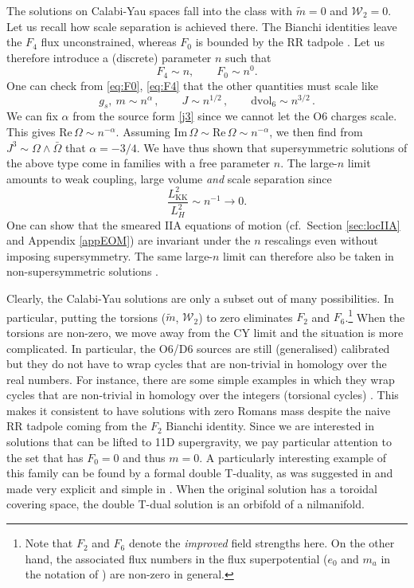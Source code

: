 \documentclass[11pt]{article}
\newcommand{\be}{\begin{equation}}
\newcommand{\ee}{\end{equation}}
\def\be{\begin{equation}}
\def\ee{\end{equation}}
\renewcommand{\[}{\left[}
\renewcommand{\]}{\right]}
\renewcommand{\(}{\left(}
\renewcommand{\)}{\right)}
\newcommand{\w}{\wedge}
\renewcommand{\Im}{\text{Im}\,}
\renewcommand{\Re}{\text{Re}\,}
\newcommand{\<}{\langle}
\renewcommand{\>}{\rangle}
\begin{document}
The solutions on Calabi-Yau spaces fall into the class with $\tilde{m}=0$ and $\mathcal{W}_2=0$. Let us recall how scale separation is achieved there.  The Bianchi identities leave the $F_4$ flux unconstrained, whereas $F_0$ is bounded by the RR tadpole \cite{DeWolfe:2005uu}. Let us therefore introduce a (discrete) parameter $n$ such that
\be
F_4 \sim n, \qquad F_0 \sim n^0.
\ee
One can check from \eqref{eq:F0}, \eqref{eq:F4} that the other quantities must scale like
\be
g_s, \: m \sim n^\alpha\,, \qquad J\sim n^{1/2}\,,\qquad \text{dvol}_6\sim  n^{3/2} \,.
\ee
We can fix $\alpha$ from the source form \eqref{j3} since we cannot let the O6 charges scale. This gives $\Re \Omega \sim n^{-\alpha}$. Assuming $\Im \Omega \sim \Re \Omega \sim n^{-\alpha}$, we then find from $J^3 \sim \Omega \w \bar\Omega$  that $\alpha = -3/4$. We have thus shown that supersymmetric solutions of the above type come in families with a free parameter $n$. The large-$n$ limit amounts to weak coupling, large volume \emph{and} scale separation since
\be
\frac{L^2_\text{KK}}{L^2_H} \sim n^{-1} \rightarrow 0.
\ee
One can show that the smeared IIA equations of motion (cf.~Section \ref{sec:locIIA} and Appendix \ref{appEOM}) are invariant under the $n$ rescalings even without imposing supersymmetry. The same large-$n$ limit can therefore also be taken in non-supersymmetric solutions \cite{Marchesano:2019hfb}.

Clearly, the Calabi-Yau solutions are only a subset out of many possibilities. In particular, putting the torsions ($\tilde{m}$, $\mathcal{W}_2$) to zero eliminates $F_2$ and $F_6$.\footnote{Note that $F_2$ and $F_6$ denote the \emph{improved} field strengths here. On the other hand, the associated flux numbers in the flux superpotential ($e_0$ and $m_a$ in the notation of \cite{DeWolfe:2005uu}) are non-zero in general.} When the torsions are non-zero, we move away from the CY limit and the situation is more complicated. In particular, the O6/D6 sources are still (generalised) calibrated \cite{Koerber:2007jb} but they do not have to wrap cycles that are non-trivial in homology over the real numbers. For instance, there are some simple examples in which they wrap cycles that are non-trivial in homology over the integers (torsional cycles) \cite{Marchesano:2006ns}. This makes it consistent to have solutions with zero Romans mass despite the naive RR tadpole coming from the $F_2$ Bianchi identity. Since we are interested in solutions that can be lifted to 11D supergravity, we pay particular attention to the set that has $F_0=0$ and thus $m=0$. A particularly interesting example of this family can be found by a formal double T-duality, as was suggested in \cite{Banks:2006hg} and made very explicit and simple in \cite{Caviezel:2008ik}. When the original solution has a toroidal covering space, the double T-dual solution is an orbifold of a nilmanifold.
\end{document}
